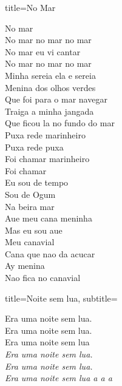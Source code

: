 \documentclass[fontsize=14pt, twoside]{scrreprt}
\begin{document}
\begin{multicols*}{2}
\begin{song}{title={No Mar}}
        \begin{verse*}
            No mar\\
            No mar no mar no mar\\
            No mar eu vi cantar\\
            No mar no mar no mar\\
            Minha sereia ela e sereia\\
            Menina dos olhos verdes\\
            Que foi para o mar navegar\\
            Traiga a minha jangada\\
            Que ficou la no fundo do mar\\
            Puxa rede marinheiro\\
            Puxa rede puxa\\
            Foi chamar marinheiro\\
            Foi chamar\\
            Eu sou de tempo\\
            Sou de Ogum\\
            Na beira mar\\
            Aue meu cana meninha\\
            Mas eu sou aue\\
            Meu canavial\\
            Cana que nao da acucar\\
            Ay menina\\
            Nao fica no canavial\\
        \end{verse*}
\end{song}

\begin{song}{title={Noite sem lua}, subtitle={\begin{small}
\end{small}}}
       \begin{verse*}
            Era uma noite sem lua.\\
            Era uma noite sem lua.\\
            Era uma noite sem lua\\
            \textit{Era uma noite sem lua.\\
            Era uma noite sem lua.\\
            Era uma noite sem lua a a a}\\


\end{verse*}
\end{song}
\end{multicols*}
\end{document}
